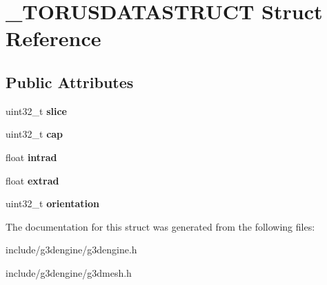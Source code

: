 \hypertarget{struct__TORUSDATASTRUCT}{}\section{\+\_\+\+T\+O\+R\+U\+S\+D\+A\+T\+A\+S\+T\+R\+U\+CT Struct Reference}
\label{struct__TORUSDATASTRUCT}
\subsection*{Public Attributes}
\begin{DoxyCompactItemize}
\item 
\mbox{\label{struct__TORUSDATASTRUCT_afde65c377f4d86b653eb18145d31fb47}} 
uint32\+\_\+t {\bfseries slice}
\item 
\mbox{\label{struct__TORUSDATASTRUCT_acd286af2d2c0addf68f5eb36fd0babcf}} 
uint32\+\_\+t {\bfseries cap}
\item 
\mbox{\label{struct__TORUSDATASTRUCT_a8b2617ade0397efd7545c5d3b8b014fd}} 
float {\bfseries intrad}
\item 
\mbox{\label{struct__TORUSDATASTRUCT_acbed2c93fcf2514638e067c689693a2e}} 
float {\bfseries extrad}
\item 
\mbox{\label{struct__TORUSDATASTRUCT_ac3de5f2adb543274f5c30cfce1256388}} 
uint32\+\_\+t {\bfseries orientation}
\end{DoxyCompactItemize}


The documentation for this struct was generated from the following files\+:\begin{DoxyCompactItemize}
\item 
include/g3dengine/g3dengine.\+h\item 
include/g3dengine/g3dmesh.\+h\end{DoxyCompactItemize}
